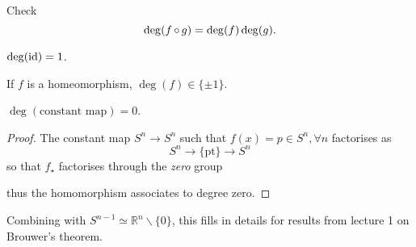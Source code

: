 \documentclass[a4paper,11pt]{article}
\begin{document}
	\begin{exer}
		Check $$\deg(f \operatorname{\circ} g) = \deg(f) \deg(g).$$
	\end{exer}

	\begin{ex}
		$\deg(\operatorname{id}) = 1$.
	\end{ex}

	\begin{cor}
		If $f$ is a homeomorphism, $\deg(f) \in \{\pm 1\}$. 
	\end{cor}

	\begin{ex}
		$\deg(\text{constant map}) = 0$. 
	\end{ex}
	\begin{proof}
		The constant map $S^n \to S^n$ such that $f(x) = p \in S^n, \forall n$ factorises as 
		\[
			S^n \to \{\text{pt}\} \to S^n
		\]
		so that $f_\star$ factorises through the \emph{zero} group
		\begin{center}
		\end{center}
		thus the homomorphism associates to degree zero.
	\end{proof}

	\begin{nt}
		Combining with $S ^{n-1} \simeq \mathbb{R}^n \backslash \{0\}$, this fills in details for results from lecture 1 on Brouwer's theorem.
	\end{nt}
\end{document}
